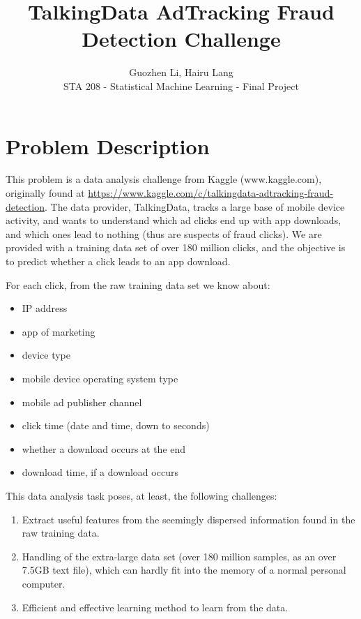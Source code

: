 \documentclass[12pt]{article}
\begin{document}
 
 
 
\title{TalkingData AdTracking Fraud Detection Challenge}%
\author{Guozhen Li, Hairu Lang \\ %
STA 208 - Statistical Machine Learning - Final Project} %

\maketitle


\section{Problem Description}
This problem is a data analysis challenge from Kaggle (www.kaggle.com), originally found at  \url{https://www.kaggle.com/c/talkingdata-adtracking-fraud-detection}.
The data provider, TalkingData, tracks a large base of mobile device activity, 
and wants to understand which ad clicks end up with app downloads, 
and which ones lead to nothing (thus are suspects of fraud clicks).
We are provided with a training data set of over 180 million clicks, 
and the objective is to predict whether a click leads to an app download.

For each click, from the raw training data set we know about:
\begin{itemize}
	\item IP address
	\item app of marketing
	\item device type
	\item mobile device operating system type
	\item mobile ad publisher channel
	\item click time (date and time, down to seconds)
	\item whether a download occurs at the end
	\item download time, if a download occurs
\end{itemize}

This data analysis task poses, at least, the following challenges:
\begin{enumerate}
	\item Extract useful features from the seemingly dispersed information found in the raw training data.
	\item Handling of the extra-large data set (over 180 million samples, as an over 7.5GB text file), which can hardly fit into the memory of a normal personal computer.
	\item Efficient and effective learning method to learn from the data.
\end{enumerate}
\end{document}
